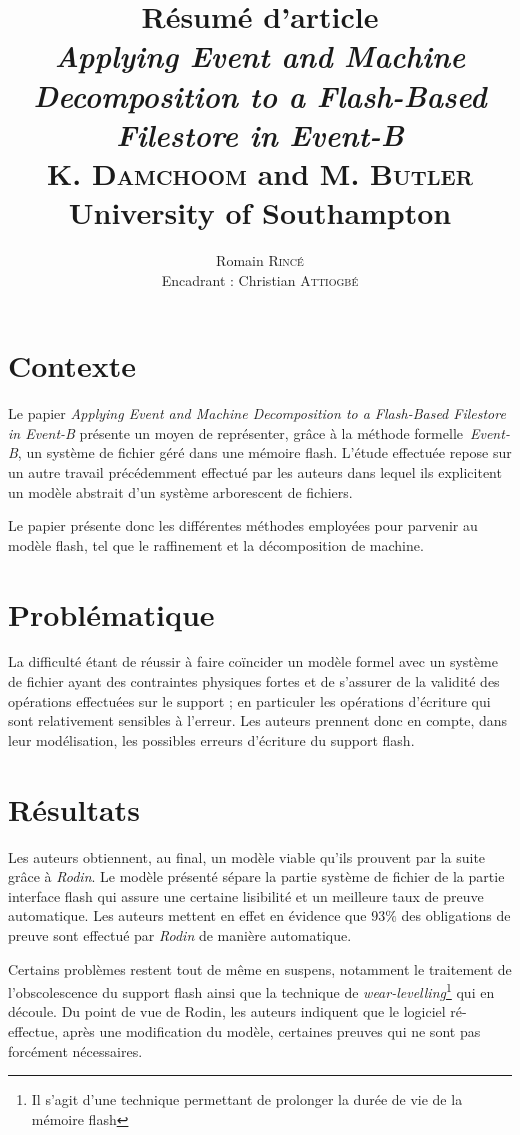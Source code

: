 \documentclass[12pt,a4paper,utf8x]{article}
\title{{\large \textbf{Résumé d'article}\\\emph{Applying Event and Machine Decomposition to a Flash-Based Filestore in Event-B}\\\vspace{0.2cm}
 {\scriptsize K. \textsc{Damchoom} and M. \textsc{Butler}\\\vspace{-0.5cm}University of Southampton}}}
\author{\small Romain \textsc{Rincé}\\{\small Encadrant : Christian \textsc{Attiogbé}}}
\date{}
\begin{document}
\maketitle
\renewcommand{\labelitemi}{$\bullet$} 


\section{Contexte}
Le papier \emph{Applying Event and Machine Decomposition to a Flash-Based Filestore in Event-B} présente un moyen de représenter, grâce à la méthode formelle~\emph{Event-B}, un système de fichier géré dans une mémoire flash. L'étude effectuée repose sur un autre travail précédemment effectué par les auteurs dans lequel ils explicitent un modèle abstrait d'un système arborescent de fichiers.

Le papier présente donc les différentes méthodes employées pour parvenir au modèle flash, tel que le raffinement et la décomposition de machine.

\section{Problématique}
La difficulté étant de réussir à faire coïncider un modèle formel avec un système de fichier ayant des contraintes physiques fortes et de s'assurer de la validité des opérations effectuées sur le support ; en particuler les opérations d'écriture qui sont relativement sensibles à l'erreur. Les auteurs prennent donc en compte, dans leur modélisation, les possibles erreurs d'écriture du support flash.

\section{Résultats}
Les auteurs obtiennent, au final, un modèle viable qu'ils prouvent par la suite grâce à \emph{Rodin}. Le modèle présenté sépare la partie \og système de fichier\fg{} de la partie \og interface flash\fg{} qui assure une certaine lisibilité et un meilleure taux de preuve automatique. Les auteurs mettent en effet en évidence que $93 \%$ des obligations de preuve sont effectué par \emph{Rodin} de manière automatique.

Certains problèmes restent tout de même en suspens, notamment le traitement de l'obscolescence du support flash ainsi que la technique de \emph{wear-levelling}\footnote{Il s'agit d'une technique permettant de prolonger la durée de vie de la mémoire flash} qui en découle. Du point de vue de Rodin, les auteurs indiquent que le logiciel ré-effectue, après une modification du modèle, certaines preuves qui ne sont pas forcément nécessaires.
\end{document}
